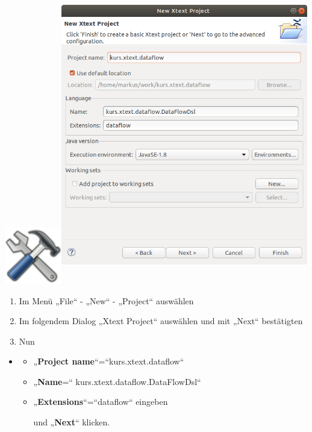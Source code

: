 \documentclass[]{article}
\providecommand{\tightlist}{%
  \setlength{\itemsep}{0pt}\setlength{\parskip}{0pt}}
\begin{document}
\includegraphics[width=0.98350in,height=0.98350in]{./Pictures/1000020100000080000000807EA91CDFA7B7F397.png}\includegraphics[width=4.24090in,height=5.15550in]{./Pictures/10000201000002650000028845D817BB3C722F32.png}

\begin{enumerate}
\def\labelenumi{\arabic{enumi}.}
\tightlist
\item
  Im Menü „File`` - „New`` - „Project`` auswählen
\item
  Im folgendem Dialog „Xtext Project`` auswählen und mit „Next``
  bestätigten
\item
  Nun 
\end{enumerate}

\begin{itemize}
\item
  \begin{itemize}
  \item
    „\textbf{Project name}``=``kurs.xtext.dataflow``
  \item
    „\textbf{Name}=`` kurs.xtext.dataflow.DataFlowDsl``
  \item
    „\textbf{Extensions}``=``dataflow`` eingeben

    und „\textbf{Next}`` klicken.
  \end{itemize}
\end{itemize}
\end{document}

